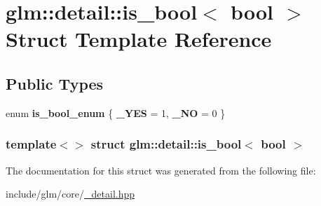 \hypertarget{structglm_1_1detail_1_1is__bool_3_01bool_01_4}{\section{glm\-:\-:detail\-:\-:is\-\_\-bool$<$ bool $>$ \-Struct \-Template \-Reference}
\label{structglm_1_1detail_1_1is__bool_3_01bool_01_4}
}
\subsection*{\-Public \-Types}
\begin{DoxyCompactItemize}
\item 
enum {\bfseries is\-\_\-bool\-\_\-enum} \{ {\bfseries \-\_\-\-Y\-E\-S} =  1, 
{\bfseries \-\_\-\-N\-O} =  0
 \}
\end{DoxyCompactItemize}
\subsubsection*{template$<$$>$ struct glm\-::detail\-::is\-\_\-bool$<$ bool $>$}



\-The documentation for this struct was generated from the following file\-:\begin{DoxyCompactItemize}
\item 
include/glm/core/\hyperlink{__detail_8hpp}{\-\_\-detail.\-hpp}\end{DoxyCompactItemize}

